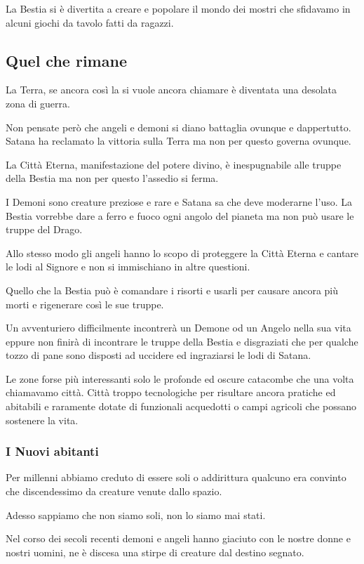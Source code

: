 \documentclass[a4paper,twoside,openany]{book}
\begin{document}
\begin{multicols}{2}
La Bestia si è divertita a creare e popolare il mondo dei mostri che sfidavamo in alcuni giochi da tavolo fatti da ragazzi.

\subsection{Quel che rimane}

La Terra, se ancora così la si vuole ancora chiamare è diventata una desolata zona di guerra.

Non pensate però che angeli e demoni si diano battaglia ovunque e dappertutto. Satana ha reclamato la vittoria sulla Terra ma non per questo governa ovunque.

La Città Eterna, manifestazione del potere divino, è inespugnabile alle truppe della Bestia ma non per questo l'assedio si ferma.

I Demoni sono creature preziose e rare e Satana sa che deve moderarne l'uso. La Bestia vorrebbe dare a ferro e fuoco ogni angolo del pianeta ma non può usare le truppe del Drago.

Allo stesso modo gli angeli hanno lo scopo di proteggere la Città Eterna e cantare le lodi al Signore e non si immischiano in altre questioni.

Quello che la Bestia può è comandare i risorti e usarli per causare ancora più morti e rigenerare così le sue truppe.

Un avventuriero difficilmente incontrerà un Demone od un Angelo nella sua vita eppure non finirà di incontrare le truppe della Bestia e disgraziati che per qualche tozzo di pane sono disposti ad uccidere ed ingraziarsi le lodi di Satana.

Le zone forse più interessanti solo le profonde ed oscure catacombe che una volta chiamavamo città.
Città troppo tecnologiche per risultare ancora pratiche ed abitabili e raramente dotate di funzionali acquedotti o campi agricoli che possano sostenere la vita.

\subsubsection{I Nuovi abitanti}

Per millenni abbiamo creduto di essere soli o addirittura qualcuno era convinto che discendessimo da creature venute dallo spazio.

Adesso sappiamo che non siamo soli, non lo siamo mai stati.

Nel corso dei secoli recenti demoni e angeli hanno giaciuto con le nostre donne e nostri uomini, ne è discesa una stirpe di creature dal destino segnato.


\end{multicols}
\end{document}
